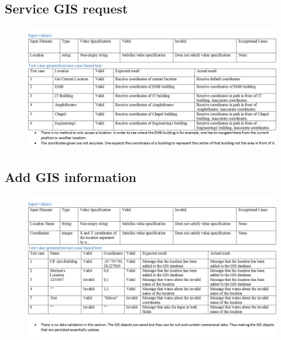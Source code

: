 \documentclass[english]{article}
\begin{document}
\subsection{Service GIS request}
\begin{figure}[ht!]
\hspace*{-2.5cm}
\includegraphics[width=180mm]{ServiceGISReq.png}
\end{figure}
\subsection{Add GIS information}
\begin{figure}[ht!]
\hspace*{-2.5cm}
\includegraphics[width=180mm]{AddGISInformation.png}
\end{figure}
\end{document}
